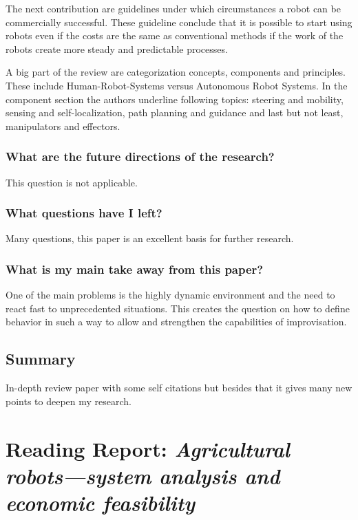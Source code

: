     The next contribution are guidelines under which circumstances a robot can be commercially successful. These guideline conclude
    that it is possible to start using robots even if the costs are the same as conventional methods if the work of
    the robots create more steady and predictable processes.
    
    A big part of the review are categorization concepts, components and principles. These include Human-Robot-Systems versus
    Autonomous Robot Systems. In the component section the authors underline following topics: steering and mobility, 
    sensing and self-localization, path planning and guidance and last but not least, manipulators and effectors.
    \subsubsection*{What are the future directions of the research?}
    This question is not applicable.
    \subsubsection*{What questions have I left?}
    Many questions, this paper is an excellent basis for further research.
    \subsubsection*{What is my main take away from this paper?}
    One of the main problems is the highly dynamic environment and the need to react fast to unprecedented situations.
    This creates the question on how to define behavior in such a way to allow and strengthen the capabilities of 
    improvisation.
    \subsection*{Summary}
    In-depth review paper with some self citations but besides that it gives many new points to deepen my research.
    

    \newpage
    \section{Reading Report: \emph{Agricultural robots—system analysis and economic feasibility}}
    \label{sec:Pedersen2006}
    \cite{Pedersen2006}
    
